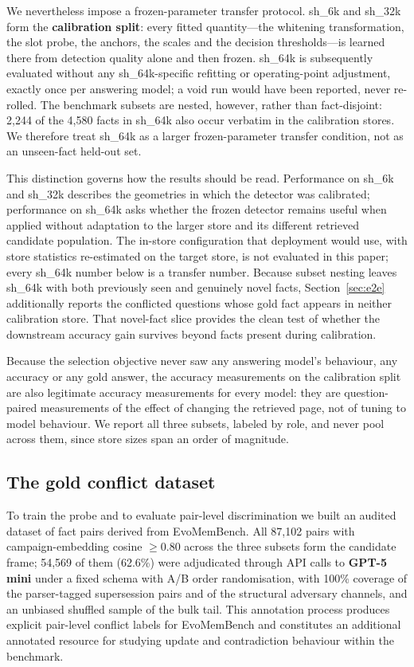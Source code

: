 \documentclass[journal=jcisd8,manuscript=article]{achemso}
\begin{document}
We nevertheless impose a frozen-parameter transfer protocol. sh\_6k and sh\_32k form the \textbf{calibration split}: every fitted quantity---the whitening transformation, the slot probe, the anchors, the scales and the decision thresholds---is learned there from detection quality alone and then frozen. sh\_64k is subsequently evaluated without any sh\_64k-specific refitting or operating-point adjustment, exactly once per answering model; a void run would have been reported, never re-rolled. The benchmark subsets are nested, however, rather than fact-disjoint: 2,244 of the 4,580 facts in sh\_64k also occur verbatim in the calibration stores. We therefore treat sh\_64k as a larger frozen-parameter transfer condition, not as an unseen-fact held-out set.

This distinction governs how the results should be read. Performance on sh\_6k and sh\_32k describes the geometries in which the detector was calibrated; performance on sh\_64k asks whether the frozen detector remains useful when applied without adaptation to the larger store and its different retrieved candidate population. The in-store configuration that deployment would use, with store statistics re-estimated on the target store, is not evaluated in this paper; every sh\_64k number below is a transfer number. Because subset nesting leaves sh\_64k with both previously seen and genuinely novel facts, Section~\ref{sec:e2e} additionally reports the conflicted questions whose gold fact appears in neither calibration store. That novel-fact slice provides the clean test of whether the downstream accuracy gain survives beyond facts present during calibration.

Because the selection objective never saw any answering model's behaviour, any accuracy or any gold answer, the accuracy measurements on the calibration split are also legitimate accuracy measurements for every model: they are question-paired measurements of the effect of changing the retrieved page, not of tuning to model behaviour. We report all three subsets, labeled by role, and never pool across them, since store sizes span an order of magnitude.

\subsection{The gold conflict dataset}
\label{sec:gold}

To train the probe and to evaluate pair-level discrimination we built an audited dataset of fact pairs derived from EvoMemBench. All 87,102 pairs with campaign-embedding cosine $\geq0.80$ across the three subsets form the candidate frame; 54,569 of them (62.6\%) were adjudicated through API calls to \textbf{GPT-5 mini} under a fixed schema with A/B order randomisation, with 100\% coverage of the parser-tagged supersession pairs and of the structural adversary channels, and an unbiased shuffled sample of the bulk tail. This annotation process produces explicit pair-level conflict labels for EvoMemBench and constitutes an additional annotated resource for studying update and contradiction behaviour within the benchmark.
\end{document}
